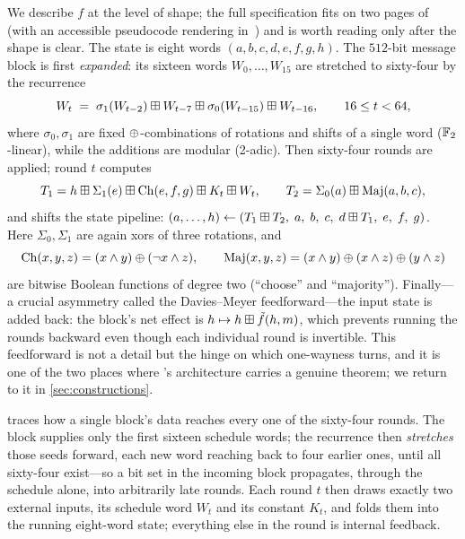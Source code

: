 We describe $f$ at the level of shape; the full specification fits on two
pages of \citet{FIPS180-4} (with an accessible pseudocode rendering
in~\citealp{WikipediaSHA2}) and is worth reading only after the shape is
clear. The state is eight words $(a,b,c,d,e,f,g,h)$. The $512$-bit message
block is first \emph{expanded}: its sixteen words $W_0, \dots, W_{15}$
are stretched to sixty-four by the recurrence
\[
  W_t \;=\; \sigma_1(W_{t-2}) \boxplus W_{t-7} \boxplus
            \sigma_0(W_{t-15}) \boxplus W_{t-16},
  \qquad 16 \le t < 64,
\]
where $\sigma_0, \sigma_1$ are fixed $\oplus$-combinations of rotations
and shifts of a single word ($\mathbb{F}_2$-linear), while the additions are
modular (2-adic). Then sixty-four rounds are applied; round $t$ computes
\[
  T_1 = h \boxplus \Sigma_1(e) \boxplus \mathrm{Ch}(e,f,g)
          \boxplus K_t \boxplus W_t,
  \qquad
  T_2 = \Sigma_0(a) \boxplus \mathrm{Maj}(a,b,c),
\]
and shifts the state pipeline:
$(a, \dots, h) \leftarrow
 (T_1 \boxplus T_2,\; a,\; b,\; c,\; d \boxplus T_1,\; e,\; f,\; g)$.
Here $\Sigma_0, \Sigma_1$ are again xors of three rotations, and
\[
  \mathrm{Ch}(x,y,z) = (x \wedge y) \oplus (\lnot x \wedge z),
  \qquad
  \mathrm{Maj}(x,y,z) = (x \wedge y) \oplus (x \wedge z) \oplus (y \wedge z)
\]
are bitwise Boolean functions of degree two (``choose'' and ``majority'').
Finally---a crucial asymmetry called the Davies--Meyer feedforward---the
input state is added back: the block's net effect is
$h \mapsto h \boxplus \tilde{f}(h, m)$, which prevents running the rounds
backward even though each individual round is invertible. This
feedforward is not a detail but the hinge on which one-wayness turns, and
it is one of the two places where \SHA{}'s architecture carries a genuine
theorem; we return to it in \cref{sec:constructions}.

 traces how a single block's data reaches every one of
the sixty-four rounds. The block supplies only the first sixteen schedule
words; the recurrence then \emph{stretches} those seeds forward, each new
word reaching back to four earlier ones, until all sixty-four exist---so a
bit set in the incoming block propagates, through the schedule alone,
into arbitrarily late rounds. Each round $t$ then draws exactly two
external inputs, its schedule word $W_t$ and its constant $K_t$, and folds
them into the running eight-word state; everything else in the round is
internal feedback.

